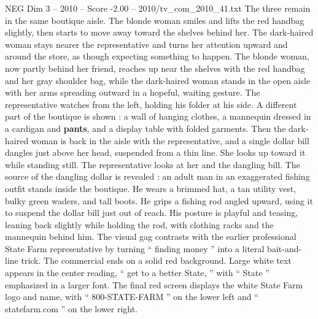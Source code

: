 \begin{textsample}{NEG Dim 3 – 2010 – Score -2.00 – 2010/tv\_com\_2010\_41.txt}
The three remain in the same boutique aisle.
The blonde woman smiles and lifts the red handbag slightly, then starts to move away toward the shelves behind her.
The dark-haired woman stays nearer the representative and turns her attention upward and around the store, as though expecting something to happen.
The blonde woman, now partly behind her friend, reaches up near the shelves with the red handbag and her gray shoulder bag, while the dark-haired woman stands in the open aisle with her arms spreading outward in a hopeful, waiting gesture.
The representative watches from the left, holding his folder at his side.
A different part of the boutique is shown : a wall of hanging clothes, a mannequin dressed in a cardigan and \textbf{pants}, and a display table with folded garments.
Then the dark-haired woman is back in the aisle with the representative, and a single dollar bill dangles just above her head, suspended from a thin line.
She looks up toward it while standing still.
The representative looks at her and the dangling bill.
The source of the dangling dollar is revealed : an adult man in an exaggerated fishing outfit stands inside the boutique.
He wears a brimmed hat, a tan utility vest, bulky green waders, and tall boots.
He grips a fishing rod angled upward, using it to suspend the dollar bill just out of reach.
His posture is playful and teasing, leaning back slightly while holding the rod, with clothing racks and the mannequin behind him.
The visual gag contrasts with the earlier professional State Farm representative by turning “ finding money ” into a literal bait-and-line trick.
The commercial ends on a solid red background.
Large white text appears in the center reading, “ get to a better State, ” with “ State ” emphasized in a larger font.
The final red screen displays the white State Farm logo and name, with “ 800-STATE-FARM ” on the lower left and “ statefarm.com ” on the lower right.

\end{textsample}
